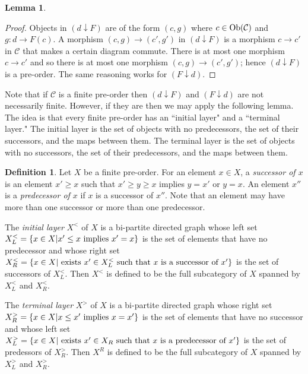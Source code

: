 \documentclass{amsart}
\def\tn{\textnormal}
\def\mc{\mathcal}
\def\Ob{\tn{Ob}}
\def\to{\rightarrow}
\def\taking{\colon}
\def\down{\downarrow}
\def\mcC{\mc{C}}
\newtheorem{lemma}[theorem]{Lemma}
\theoremstyle{remark}
\theoremstyle{definition}
\newtheorem{definition}[theorem]{Definition}
\begin{document}
{\begin{lemma}
\end{lemma}

\begin{proof}

Objects in $(d\down F)$ are of the form $(c,g)$ where $c\in\Ob(\mcC)$ and $g\taking d\to F(c)$.  A morphism $(c,g)\to(c',g')$ in $(d\down F)$ is a morphism $c\to c'$ in $\mcC$ that makes a certain diagram commute.  There is at most one morphism $c\to c'$ and so there is at most one morphism $(c,g)\to(c',g')$; hence $(d\down F)$ is a pre-order.  The same reasoning works for $(F\down d)$.

\end{proof}

Note that if $\mcC$ is a finite pre-order then $(d\down F)$ and $(F\down d)$ are not necessarily finite.  However, if they are then we may apply the following lemma.  The idea is that every finite pre-order has an ``initial layer" and a ``terminal layer."  The initial layer is the set of objects with no predecessors, the set of their successors, and the maps between them.  The terminal layer is the set of objects with no successors, the set of their predecessors, and the maps between them.    

\begin{definition}

Let $X$ be a finite pre-order.  For an element $x\in X$, a {\em successor of $x$} is an element $x'\geq x$ such that $x'\geq y\geq x$ implies $y=x'$ or $y=x$.  An element $x''$ is a {\em predecessor of $x$} if $x$ is a successor of $x''$.  Note that an element may have more than one successor or more than one predecessor. 

The {\em initial layer} $X^<$ of $X$ is a bi-partite directed graph whose left set $X^<_L=\{x\in X| x'\leq x\tn{ implies } x'=x\}$ is the set of elements that have no predecessor and whose right set $X^<_R=\{x\in X | \tn{ exists } x'\in X_L^< \tn{ such that } x \tn{ is a successor of } x'\}$ is the set of successors of $X_L^<$.  Then $X^<$ is defined to be the full subcategory of $X$ spanned by $X_L^<$ and $X_R^<$.

The {\em terminal layer} $X^>$ of $X$ is a bi-partite directed graph whose right set $X^>_R=\{x\in X| x\leq x'\tn{ implies } x=x'\}$ is the set of elements that have no successor and whose left set  $X^>_L=\{x\in X | \tn{ exists } x'\in X_R \tn{ such that } x \tn{ is a predecessor of } x'\}$ is the set of predessors of $X_R^>$.  Then $X^R$ is defined to be the full subcategory of $X$ spanned by $X_L^>$ and $X_R^>$.


\end{definition}}
\end{document}
